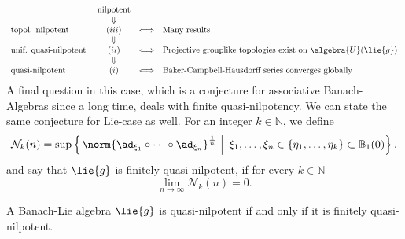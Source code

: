\documentclass[
11pt,                          %
english                        %
]{article}
\begin{document}
\begin{equation}
	\label{classification}
	\begin{array}{lccl}
		& \text{nilpotent} &
		\\
		& \Downarrow &
		\\
		\text{topol. nilpotent } &
		(iii) & \Longleftrightarrow &
		\text{Many results}
		\\
		& \Downarrow &
		\\
		\text{unif. quasi-nilpotent } &
		(ii) & \Longleftrightarrow &
		\text{Projective grouplike topologies exist on }
		\algebra{U}(\lie{g})
		\\
		& \Downarrow &
		\\
		\text{quasi-nilpotent } &
		(i) & \Longleftrightarrow &
		\text{Baker-Campbell-Hausdorff series converges globally}
	\end{array}
\end{equation}
A final question in this case, which is a conjecture for associative Banach-Algebras 
since a long time, deals with finite quasi-nilpotency. We can state the same 
conjecture for Lie-case as well. For an integer $k \in \mathbb{N}$, we define
\begin{equation}
	\mathcal{N}_k(n)
	=
	\sup \left\{ 
	\left.
		\norm{ \ad_{\xi_1} \circ \cdots \circ \ad_{\xi_n} }^{\frac{1}{n}} 
	\ \right| \
		\xi_1, \ldots, \xi_n 
		\in 
		\{\eta_1, \ldots, \eta_k \}
		\subset 
		\mathbb{B}_1(0)
	\right\}.
\end{equation}
and say that $\lie{g}$ is finitely quasi-nilpotent, if for every $k \in \mathbb{N}$
\begin{equation}
	\lim\limits_{n \rightarrow \infty}
	\mathcal{N}_k(n)
	=
	0.
\end{equation}
\begin{conjecture}
	A Banach-Lie algebra $\lie{g}$ is quasi-nilpotent if and only if it is finitely 
	quasi-nilpotent.
\end{conjecture}
\end{document}
